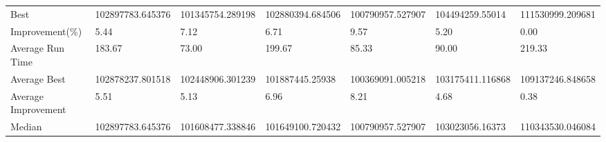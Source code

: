 \begin{table}[H]
{\begin{tabular}{lllllll}
\cellcolor[HTML]{ECF4FF}Best                & 102897783.645376 & 101345754.289198 & 102880394.684506 & 100790957.527907 & 104494259.55014  & 111530999.209681 \\
\cellcolor[HTML]{ECF4FF}Improvement(\%)     & 5.44             & 7.12             & 6.71             & 9.57             & 5.20             & 0.00             \\
\rowcolor[HTML]{CBCEFB} 
\cellcolor[HTML]{DAE8FC}Average Run Time    & 183.67           & 73.00            & 199.67           & 85.33            & 90.00            & 219.33           \\
\rowcolor[HTML]{CBCEFB} 
\cellcolor[HTML]{DAE8FC}Average Best        & 102878237.801518 & 102448906.301239 & 101887445.25938  & 100369091.005218 & 103175411.116868 & 109137246.848658 \\
\rowcolor[HTML]{CBCEFB} 
\cellcolor[HTML]{DAE8FC}Average Improvement & 5.51             & 5.13             & 6.96             & 8.21             & 4.68             & 0.38             \\
\rowcolor[HTML]{CBCEFB} 
\cellcolor[HTML]{DAE8FC}Median              & 102897783.645376 & 101608477.338846 & 101649100.720432 & 100790957.527907 & 103023056.16373  & 110343530.046084
\end{tabular}%
}
\end{table}